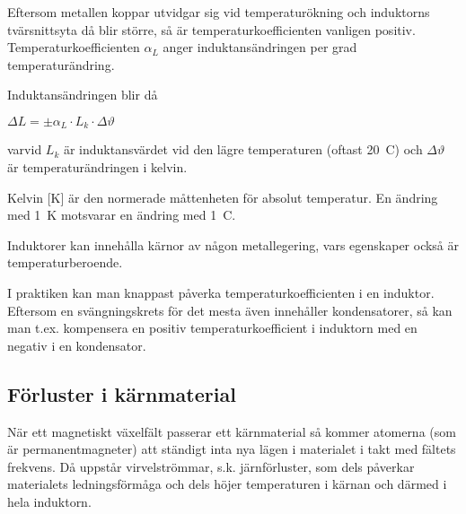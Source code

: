 Eftersom metallen koppar utvidgar sig vid temperaturökning och induktorns
tvärsnittsyta då blir större, så är temperaturkoefficienten vanligen positiv.
Temperaturkoefficienten \(\alpha_L\) anger induktansändringen per grad
temperaturändring.

Induktansändringen blir då

\(\Delta L = \pm \alpha _L \cdot L_k \cdot \Delta\vartheta\)

varvid \(L_k\) är induktansvärdet vid den lägre temperaturen (oftast
20~\degree C) och \(\Delta\vartheta\) är temperaturändringen i kelvin.

Kelvin [K] är den normerade måttenheten för absolut temperatur.
En ändring med 1~K motsvarar en ändring med 1~\degree C.

Induktorer kan innehålla kärnor av någon metallegering, vars egenskaper också är
temperaturberoende.

I praktiken kan man knappast påverka temperaturkoefficienten i en induktor.
Eftersom en svängningskrets för det mesta även innehåller kondensatorer, så kan
man t.ex. kompensera en positiv temperaturkoefficient i induktorn med en negativ
i en kondensator.

\subsection{Förluster i kärnmaterial}

När ett magnetiskt växelfält passerar ett kärnmaterial så kommer atomerna (som
är permanentmagneter) att ständigt inta nya lägen i materialet i takt med
fältets frekvens. Då uppstår virvelströmmar, s.k. järnförluster, som dels
påverkar materialets ledningsförmåga och dels höjer temperaturen i kärnan och
därmed i hela induktorn.
